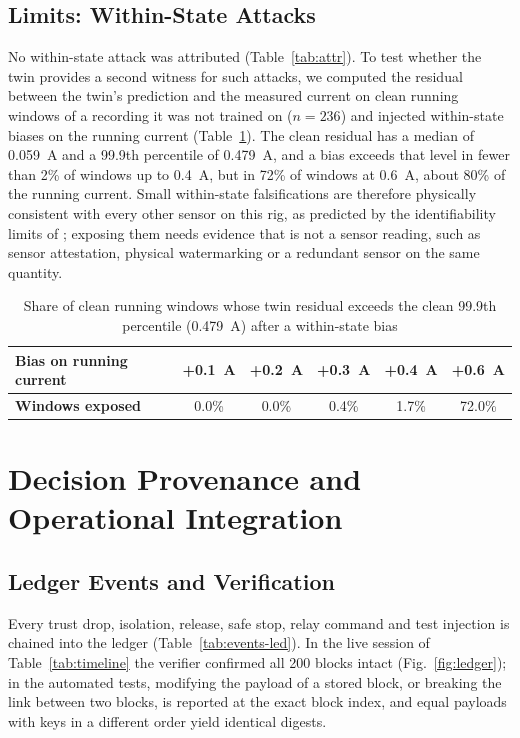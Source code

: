 \documentclass[11pt,a4paper]{article}
\begin{document}
\subsection{Limits: Within-State Attacks}

No within-state attack was attributed (Table~\ref{tab:attr}). To test whether the twin provides a second witness for such attacks, we computed the residual between the twin's prediction and the measured current on clean running windows of a recording it was not trained on ($n = 236$) and injected within-state biases on the running current (Table~\ref{tab:residual}). The clean residual has a median of 0.059~A and a 99.9th percentile of 0.479~A, and a bias exceeds that level in fewer than 2\% of windows up to 0.4~A, but in 72\% of windows at 0.6~A, about 80\% of the running current. Small within-state falsifications are therefore physically consistent with every other sensor on this rig, as predicted by the identifiability limits of \cite{pasqualetti2013identification}; exposing them needs evidence that is not a sensor reading, such as sensor attestation, physical watermarking \cite{mo2009replay} or a redundant sensor on the same quantity.

\begin{table}[H]
\centering
\caption{Share of clean running windows whose twin residual exceeds the clean 99.9th percentile (0.479~A) after a within-state bias}
\label{tab:residual}
\small
\begin{tabular}{@{}l c c c c c@{}}
\toprule
\textbf{Bias on running current} & +0.1~A & +0.2~A & +0.3~A & +0.4~A & +0.6~A \\
\midrule
\textbf{Windows exposed} & 0.0\% & 0.0\% & 0.4\% & 1.7\% & 72.0\% \\
\bottomrule
\end{tabular}
\end{table}

\section{Decision Provenance and Operational Integration}
\label{sec:provenance}

\subsection{Ledger Events and Verification}

Every trust drop, isolation, release, safe stop, relay command and test injection is chained into the ledger (Table~\ref{tab:events-led}). In the live session of Table~\ref{tab:timeline} the verifier confirmed all 200 blocks intact (Fig.~\ref{fig:ledger}); in the automated tests, modifying the payload of a stored block, or breaking the link between two blocks, is reported at the exact block index, and equal payloads with keys in a different order yield identical digests.
\end{document}
